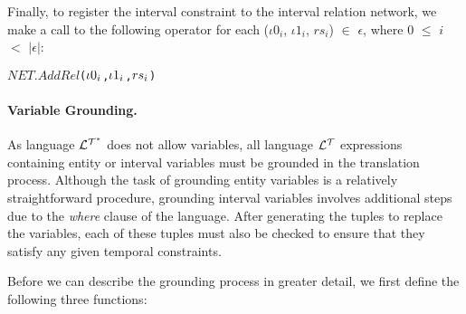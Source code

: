 \documentclass[11pt]{report}
\newenvironment{vverbatim}
{
  \begin{alltt}
}
{
    \vspace{-\baselineskip}
  \end{alltt}
}
\begin{document}
            \noindent
            Finally, to register the interval constraint to the interval
            relation network, we make a call to the following operator
            for each (${\iota}0_i$, ${\iota}1_i$, $rs_i$) $\in$
            $\epsilon$, where $0$ $\leq$ $i$ $<$ $|\epsilon|$:

            \begin{vverbatim}
  \(NET.AddRel\)(\({\iota}0\sb{i}\), \({\iota}1\sb{i}\), \(rs\sb{i}\))
            \end{vverbatim}

          \paragraph
            {\bf Variable Grounding.}

            As language ${\cal L^{T^*}}$ does not allow variables, all
	    language ${\cal L^T}$ expressions containing entity or interval
            variables must be grounded in the translation process. Although
            the task of grounding entity variables is a relatively
            straightforward procedure, grounding interval variables involves
            additional steps due to the {\em where} clause of the language.
            After generating the tuples to replace the variables, each of
            these tuples must also be checked to ensure that they satisfy
            any given temporal constraints.

            Before we can describe the grounding process in greater detail,
            we first define the following three functions:
\end{document}
